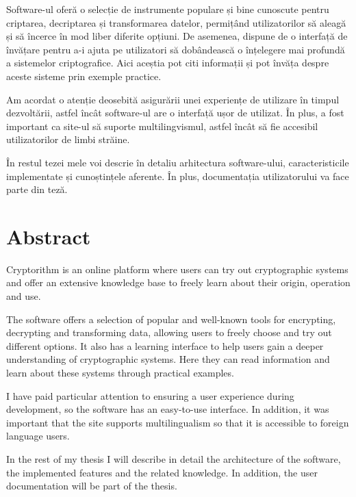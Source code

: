 Software-ul oferă o selecție de instrumente populare și bine cunoscute pentru criptarea, decriptarea și transformarea datelor, permițând utilizatorilor să aleagă și să încerce în mod liber diferite opțiuni. De asemenea, dispune de o interfață de învățare pentru a-i ajuta pe utilizatori să dobândească o înțelegere mai profundă a sistemelor criptografice. Aici aceștia pot citi informații și pot învăța despre aceste sisteme prin exemple practice. 

Am acordat o atenție deosebită asigurării unei experiențe de utilizare în timpul dezvoltării, astfel încât software-ul are o interfață ușor de utilizat. În plus, a fost important ca site-ul să suporte multilingvismul, astfel încât să fie accesibil utilizatorilor de limbi străine.

În restul tezei mele voi descrie în detaliu arhitectura software-ului, caracteristicile implementate și cunoștințele aferente. În plus, documentația utilizatorului va face parte din teză.

\vfill
{}

\chapter*{Abstract}

Cryptorithm is an online platform where users can try out cryptographic systems and offer an extensive knowledge base to freely learn about their origin, operation and use.

The software offers a selection of popular and well-known tools for encrypting, decrypting and transforming data, allowing users to freely choose and try out different options. It also has a learning interface to help users gain a deeper understanding of cryptographic systems. Here they can read information and learn about these systems through practical examples. 

I have paid particular attention to ensuring a user experience during development, so the software has an easy-to-use interface. In addition, it was important that the site supports multilingualism so that it is accessible to foreign language users.

In the rest of my thesis I will describe in detail the architecture of the software, the implemented features and the related knowledge. In addition, the user documentation will be part of the thesis.

\vfill
\dolgozatnyelve
{}